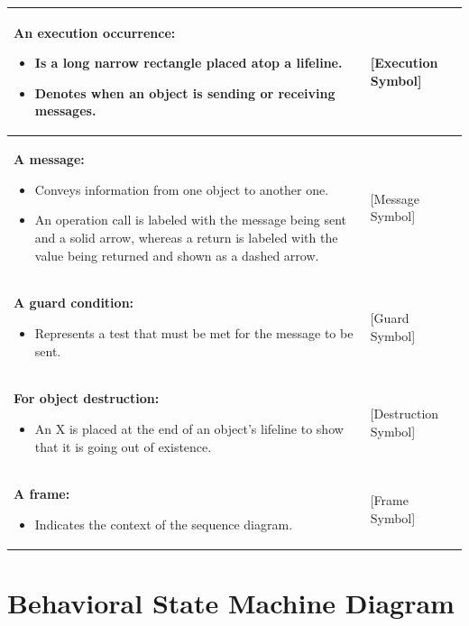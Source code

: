 \documentclass[12pt,a4paper]{report}
\begin{document}
\begin{longtable}{|p{8cm}|p{4cm}|}
\textbf{An execution occurrence:} \newline
\begin{itemize}
    \item Is a long narrow rectangle placed atop a lifeline.
    \item Denotes when an object is sending or receiving messages.
\end{itemize} & [Execution Symbol] \\
\hline

\textbf{A message:} \newline
\begin{itemize}
    \item Conveys information from one object to another one.
    \item An operation call is labeled with the message being sent and a solid arrow, whereas a return is labeled with the value being returned and shown as a dashed arrow.
\end{itemize} & [Message Symbol] \\
\hline

\textbf{A guard condition:} \newline
\begin{itemize}
    \item Represents a test that must be met for the message to be sent.
\end{itemize} & [Guard Symbol] \\
\hline

\textbf{For object destruction:} \newline
\begin{itemize}
    \item An X is placed at the end of an object's lifeline to show that it is going out of existence.
\end{itemize} & [Destruction Symbol] \\
\hline

\textbf{A frame:} \newline
\begin{itemize}
    \item Indicates the context of the sequence diagram.
\end{itemize} & [Frame Symbol] \\
\hline

\end{longtable}

\section{Behavioral State Machine Diagram}
\end{document}
